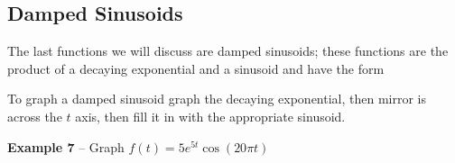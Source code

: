 \documentclass{handout}
\begin{document}
\subsection{Damped Sinusoids}
The last functions we will discuss are damped sinusoids; these functions are the product of a decaying exponential and a sinusoid and have the form


To graph a damped sinusoid graph the decaying exponential, then mirror is across the $t$ axis, then fill it in with the appropriate sinusoid.

\textbf{Example 7} -- Graph $f(t) = 5e^{5t}\cos\left(20\pi t  \right)$

\newpage
\clearpage
\pagebreak

\newpage
\clearpage
\pagebreak

\newpage
\clearpage
\pagebreak

\newpage
\clearpage
\pagebreak

\newpage
\clearpage
\pagebreak

\newpage
\clearpage
\pagebreak

\newpage
\clearpage
\pagebreak
\end{document}
